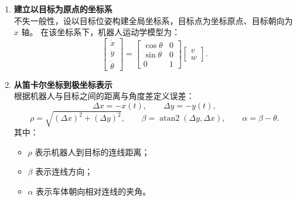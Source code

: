 \documentclass[../main.tex]{subfiles}
\begin{document}
\begin{enumerate}
\begin{itemize}
{\begin{enumerate}
                                \item \textbf{建立以目标为原点的坐标系}\\
                                不失一般性，设以目标位姿构建全局坐标系，目标点为坐标原点、目标朝向为 $x$ 轴。  
                                在该坐标系下，机器人运动学模型为：
                                \[
                                \begin{bmatrix}
                                    \dot{x} \\[2pt]
                                    \dot{y} \\[2pt]
                                    \dot{\theta}
                                \end{bmatrix}
                                =
                                \begin{bmatrix}
                                    \cos\theta & 0 \\[2pt]
                                    \sin\theta & 0 \\[2pt]
                                    0 & 1
                                \end{bmatrix}
                                \begin{bmatrix}
                                    v \\[2pt]
                                    w
                                \end{bmatrix}.
                                \]
                            
                                \item \textbf{从笛卡尔坐标到极坐标表示}\\
                                根据机器人与目标之间的距离与角度差定义误差：
                                \[
                                \Delta x = -x(t), \qquad
                                \Delta y = -y(t),
                                \]
                                \[
                                \rho = \sqrt{(\Delta x)^2 + (\Delta y)^2}, \qquad
                                \beta = \operatorname{atan2}(\Delta y, \Delta x), \qquad
                                \alpha = \beta - \theta.
                                \]
                                其中：
                                \begin{itemize}
                                    \item $\rho$ 表示机器人到目标的连线距离；
                                    \item $\beta$ 表示连线方向；
                                    \item $\alpha$ 表示车体朝向相对连线的夹角。
                                \end{itemize}
                            

\end{enumerate}}
\end{itemize}
\end{enumerate}
\end{document}

